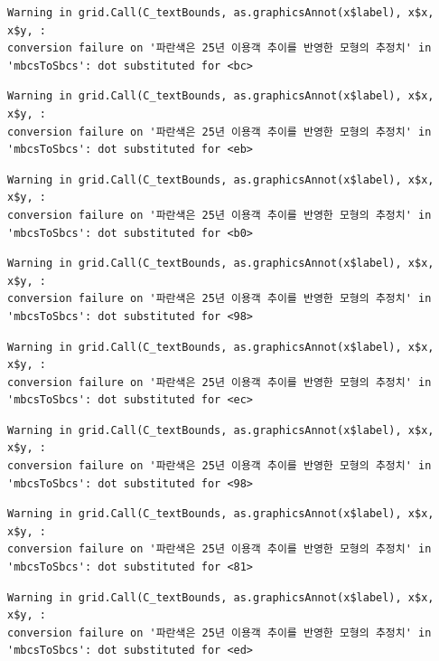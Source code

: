 \documentclass[
  letterpaper,
  DIV=11,
  numbers=noendperiod]{scrreprt}
\begin{document}
\begin{verbatim}
Warning in grid.Call(C_textBounds, as.graphicsAnnot(x$label), x$x, x$y, :
conversion failure on '파란색은 25년 이용객 추이를 반영한 모형의 추정치' in
'mbcsToSbcs': dot substituted for <bc>
\end{verbatim}

\begin{verbatim}
Warning in grid.Call(C_textBounds, as.graphicsAnnot(x$label), x$x, x$y, :
conversion failure on '파란색은 25년 이용객 추이를 반영한 모형의 추정치' in
'mbcsToSbcs': dot substituted for <eb>
\end{verbatim}

\begin{verbatim}
Warning in grid.Call(C_textBounds, as.graphicsAnnot(x$label), x$x, x$y, :
conversion failure on '파란색은 25년 이용객 추이를 반영한 모형의 추정치' in
'mbcsToSbcs': dot substituted for <b0>
\end{verbatim}

\begin{verbatim}
Warning in grid.Call(C_textBounds, as.graphicsAnnot(x$label), x$x, x$y, :
conversion failure on '파란색은 25년 이용객 추이를 반영한 모형의 추정치' in
'mbcsToSbcs': dot substituted for <98>
\end{verbatim}

\begin{verbatim}
Warning in grid.Call(C_textBounds, as.graphicsAnnot(x$label), x$x, x$y, :
conversion failure on '파란색은 25년 이용객 추이를 반영한 모형의 추정치' in
'mbcsToSbcs': dot substituted for <ec>
\end{verbatim}

\begin{verbatim}
Warning in grid.Call(C_textBounds, as.graphicsAnnot(x$label), x$x, x$y, :
conversion failure on '파란색은 25년 이용객 추이를 반영한 모형의 추정치' in
'mbcsToSbcs': dot substituted for <98>
\end{verbatim}

\begin{verbatim}
Warning in grid.Call(C_textBounds, as.graphicsAnnot(x$label), x$x, x$y, :
conversion failure on '파란색은 25년 이용객 추이를 반영한 모형의 추정치' in
'mbcsToSbcs': dot substituted for <81>
\end{verbatim}

\begin{verbatim}
Warning in grid.Call(C_textBounds, as.graphicsAnnot(x$label), x$x, x$y, :
conversion failure on '파란색은 25년 이용객 추이를 반영한 모형의 추정치' in
'mbcsToSbcs': dot substituted for <ed>
\end{verbatim}
\end{document}

